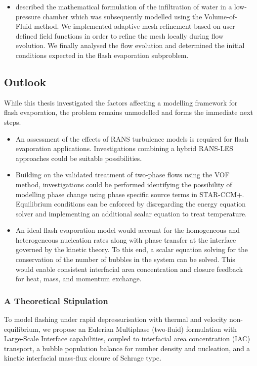 \begin{itemize}
    \item described the mathematical formulation of the infiltration of water in a low-pressure
    chamber which was subsequently modelled using the Volume-of-Fluid method.
    We implemented adaptive mesh refinement based on user-defined field functions in order to
    refine the mesh locally during flow evolution. We finally analysed the flow evolution and 
    determined the initial conditions expected in the flash evaporation subproblem.    
\end{itemize}

\subsection{Outlook}
While this thesis investigated the factors affecting a modelling framework for flash evaporation, the 
 problem remains unmodelled and forms the immediate next steps. 
 \begin{itemize}
    \item An assessment of the effects of RANS turbulence models is required for flash evaporation applications.
    Investigations combining a hybrid RANS-LES approaches could be suitable possibilities.
    \item Building on the validated treatment 
 of two-phase flows using the VOF method, investigations could be performed identifying 
 the possibility of modelling phase change using phase specific source terms in STAR-CCM+. Equilibrium
 conditions can be enforced by disregarding the energy equation solver and implementing an additional 
 scalar equation to treat temperature. 
    \item An ideal flash evaporation model would account for the homogeneous and heterogeneous nucleation rates
    along with phase transfer at the interface governed by the kinetic theory. To this end, a scalar equation 
    solving for the conservation of the number of bubbles in the system can be solved. This would enable
    consistent interfacial area concentration and closure feedback for heat, mass, and momentum exchange.
 \end{itemize}

\subsubsection{A Theoretical Stipulation}
To model flashing under rapid depressurisation with thermal and velocity non-equilibrium, 
we propose an Eulerian Multiphase (two-fluid) formulation 
with Large-Scale Interface capabilities, coupled to interfacial 
area concentration (IAC) transport, a bubble population balance for 
number density and nucleation, and a kinetic interfacial mass-flux closure of Schrage type.

